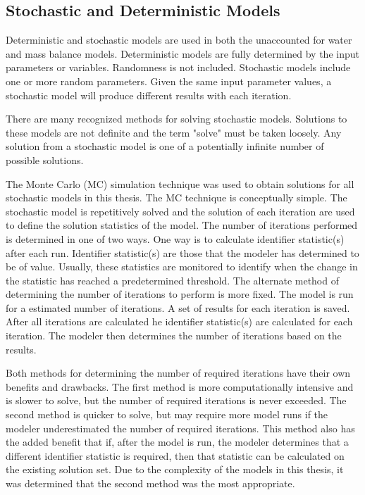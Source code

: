 \begin{linenumbers}
\clearpage{}
\section{Stochastic and Deterministic Models}
\label{sec:StochAndDetermModels}

Deterministic and stochastic models are used in both the unaccounted for water and mass balance models.  Deterministic models are fully determined by the input parameters or variables.  Randomness is not included.  Stochastic models include one or more random parameters.  Given the same input parameter values, a stochastic model will produce different results with each iteration.

There are many recognized methods for solving stochastic models.  Solutions to these models are not definite and the term "solve" must be taken loosely.  Any solution from a stochastic model is one of a potentially infinite number of possible solutions.

The Monte Carlo (MC) simulation technique was used to obtain solutions for all stochastic models in this thesis.  The MC technique is conceptually simple.  The stochastic model is repetitively solved and the solution of each iteration are used to define the solution statistics of the model.  The number of iterations performed is determined in one of two ways.  One way is to calculate identifier statistic(s) after each run.  Identifier statistic(s) are those that the modeler has determined to be of value.  Usually, these statistics are monitored to identify when the change in the statistic has reached a predetermined threshold.  The alternate method of determining the number of iterations to perform is more fixed.  The model is run for a estimated number of iterations.  A set of results for each iteration is saved.  After all iterations are calculated he identifier statistic(s) are calculated for each iteration.  The modeler then determines the number of iterations based on the results.

Both methods for determining the number of required iterations have their own benefits and drawbacks.  The first method is more computationally intensive and is slower to solve, but the number of required iterations is never exceeded.  The second method is quicker to solve, but may require more model runs if the modeler underestimated the number of required iterations.  This method also has the added benefit that if, after the model is run, the modeler determines that a different identifier statistic is required, then that statistic can be calculated on the existing solution set.  Due to the complexity of the models in this thesis, it was determined that the second method was the most appropriate.


\end{linenumbers}
